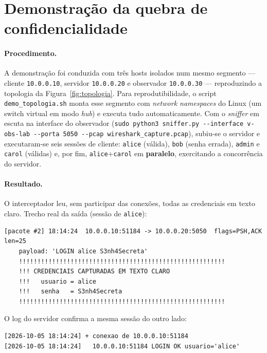 \documentclass[11pt,a4paper]{article}
\begin{document}
\section{Demonstração da quebra de confidencialidade}
\label{sec:demo}

\paragraph{Procedimento.} A demonstração foi conduzida com três hosts isolados
num mesmo segmento — cliente \texttt{10.0.0.10}, servidor \texttt{10.0.0.20} e
observador \texttt{10.0.0.30} — reproduzindo a topologia da
Figura~\ref{fig:topologia}. Para reprodutibilidade, o script
\texttt{demo\_topologia.sh} monta esse segmento com \textit{network namespaces}
do Linux (um switch virtual em modo \textit{hub}) e executa tudo
automaticamente. Com o \textit{sniffer} em escuta na interface do observador
(\texttt{sudo python3 sniffer.py -{}-interface v-obs-lab -{}-porta 5050
-{}-pcap wireshark_capture.pcap}), subiu-se o servidor e executaram-se seis sessões de
cliente: \texttt{alice} (válida), \texttt{bob} (senha errada), \texttt{admin} e
\texttt{carol} (válidas) e, por fim, \texttt{alice}+\texttt{carol} em
\textbf{paralelo}, exercitando a concorrência do servidor.

\paragraph{Resultado.} O interceptador leu, sem participar das conexões, todas as
credenciais em texto claro. Trecho real da saída (sessão de \texttt{alice}):

\begin{lstlisting}[style=saida,caption={Saída real do \textit{sniffer}: credenciais capturadas em texto claro.}]
[pacote #2] 18:14:24  10.0.0.10:51184 -> 10.0.0.20:5050  flags=PSH,ACK  len=25
    payload: 'LOGIN alice S3nh4Secreta'
    !!!!!!!!!!!!!!!!!!!!!!!!!!!!!!!!!!!!!!!!!!!!!!!!!!!!!!!!
    !!! CREDENCIAIS CAPTURADAS EM TEXTO CLARO
    !!!   usuario = alice
    !!!   senha   = S3nh4Secreta
    !!!!!!!!!!!!!!!!!!!!!!!!!!!!!!!!!!!!!!!!!!!!!!!!!!!!!!!!
\end{lstlisting}

O log do servidor confirma a mesma sessão do outro lado:

\begin{lstlisting}[style=saida]
[2026-10-05 18:14:24] + conexao de 10.0.0.10:51184
[2026-10-05 18:14:24]   10.0.0.10:51184 LOGIN OK usuario='alice'
\end{lstlisting}
\end{document}
